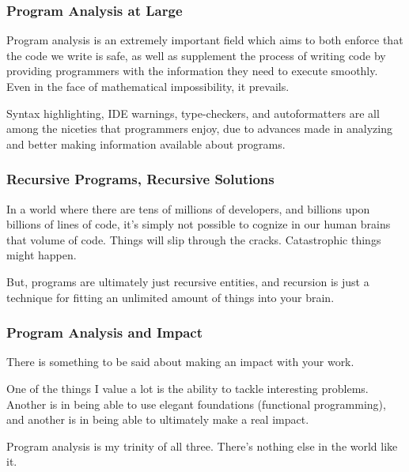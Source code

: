 \documentclass[aspectratio=169, handout]{beamer}
\begin{document}

\begin{frame}[fragile]
  \frametitle{Program Analysis at Large}

  Program analysis is an extremely important field which aims to both
  enforce that the code we write is safe, as well as supplement the process
  of writing code by providing programmers with the information they need to
  execute smoothly. Even in the face of mathematical impossibility, it
  prevails.

  \pause
  \vspace{\fill}

  Syntax highlighting, IDE warnings, type-checkers, and autoformatters are all
  among the niceties that programmers enjoy, due to advances made in analyzing
  and better making information available about programs.
\end{frame}

\begin{frame}[fragile]
  \frametitle{Recursive Programs, Recursive Solutions}

  In a world where there are tens of millions of developers, and billions upon
  billions of lines of code, it's simply not possible to cognize in our human
  brains that volume of code. Things will slip through the cracks. Catastrophic
  things might happen.

  \pause
  \vspace{\fill}

  But, programs are ultimately just recursive entities, and recursion is just a
  technique for fitting an unlimited amount of things into your brain.

\end{frame}

\begin{frame}[fragile]
  \frametitle{Program Analysis and Impact}

  There is something to be said about making an impact with your work.

  \pause
  \vspace{\fill}

  One of the things I value a lot is the ability to tackle interesting problems.
  Another is in being able to use elegant foundations (functional programming),
  and another is in being able to ultimately make a real impact.

  \pause
  \vspace{\fill}

  Program analysis is my trinity of all three. There's nothing else in the world
  like it.
\end{frame}
\end{document}
